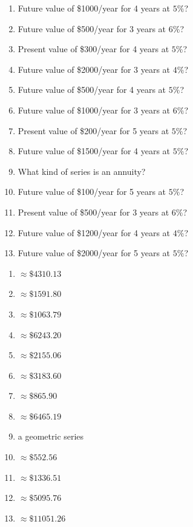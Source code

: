 \documentclass[11pt]{article}
\begin{document}
\begin{recapbox}
\begin{multicols}{2}
\small
\begin{enumerate}[leftmargin=*,itemsep=3pt]
  \item Future value of \$1000/year for 4 years at $5\%$?
  \item Future value of \$500/year for 3 years at $6\%$?
  \item Present value of \$300/year for 4 years at $5\%$?
  \item Future value of \$2000/year for 3 years at $4\%$?
  \item Future value of \$500/year for 4 years at $5\%$?
  \item Future value of \$1000/year for 3 years at $6\%$?
  \item Present value of \$200/year for 5 years at $5\%$?
  \item Future value of \$1500/year for 4 years at $5\%$?
  \item What kind of series is an annuity?
  \item Future value of \$100/year for 5 years at $5\%$?
  \item Present value of \$500/year for 3 years at $6\%$?
  \item Future value of \$1200/year for 4 years at $4\%$?
  \item Future value of \$2000/year for 5 years at $5\%$?
\end{enumerate}
\end{multicols}
\end{recapbox}

\begin{keybox}
\begin{multicols}{2}
\small
\begin{enumerate}[leftmargin=*,itemsep=3pt]
  \item $\approx\$4310.13$
  \item $\approx\$1591.80$
  \item $\approx\$1063.79$
  \item $\approx\$6243.20$
  \item $\approx\$2155.06$
  \item $\approx\$3183.60$
  \item $\approx\$865.90$
  \item $\approx\$6465.19$
  \item a geometric series
  \item $\approx\$552.56$
  \item $\approx\$1336.51$
  \item $\approx\$5095.76$
  \item $\approx\$11051.26$
\end{enumerate}
\end{multicols}
\end{keybox}
\end{document}
